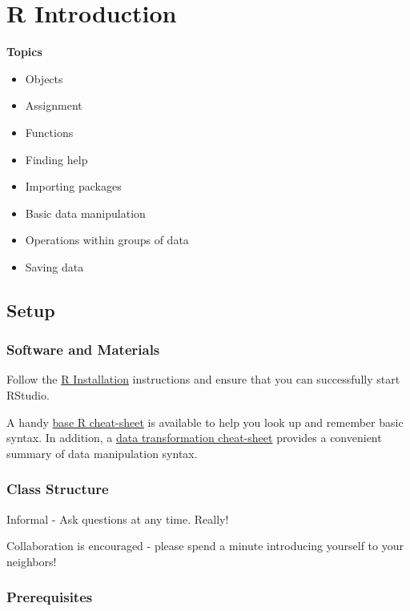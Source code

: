 \documentclass[
]{book}
\providecommand{\tightlist}{%
  \setlength{\itemsep}{0pt}\setlength{\parskip}{0pt}}
\begin{document}
\hypertarget{r-introduction}{%
\chapter{R Introduction}\label{r-introduction}}

\textbf{Topics}

\begin{itemize}
\tightlist
\item
  Objects
\item
  Assignment
\item
  Functions
\item
  Finding help
\item
  Importing packages
\item
  Basic data manipulation
\item
  Operations within groups of data
\item
  Saving data
\end{itemize}

\hypertarget{setup}{%
\section{Setup}\label{setup}}

\hypertarget{software-and-materials}{%
\subsection{Software and Materials}\label{software-and-materials}}

Follow the \href{./Rinstall.html}{R Installation} instructions and ensure that you can successfully start RStudio.

A handy \href{R/Rintro/base-r-cheat-sheet.pdf}{base R cheat-sheet} is available to help you look up and remember basic syntax. In addition, a \href{R/Rintro/data-transformation-cheat-sheet.pdf}{data transformation cheat-sheet} provides a convenient summary of data manipulation syntax.

\hypertarget{class-structure}{%
\subsection{Class Structure}\label{class-structure}}

Informal - Ask questions at any time. Really!

Collaboration is encouraged - please spend a minute introducing yourself to your neighbors!

\hypertarget{prerequisites}{%
\subsection{Prerequisites}\label{prerequisites}}
\end{document}
